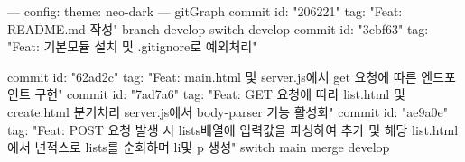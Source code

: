 ---
config:
  theme: neo-dark
---
gitGraph
    commit id: "206221" tag: "Feat: README.md 작성"
    branch develop
    switch develop
    commit id: "3cbf63" tag: "Feat: 기본모듈 설치 및 .gitignore로 예외처리"
    
    commit id: "62ad2c" tag: "Feat: main.html 및 server.js에서 get 요청에 따른 엔드포인트 구현"
    commit id: "7ad7a6" tag: "Feat: GET 요청에 따라 list.html 및 create.html 분기처리 server.js에서 body-parser 기능 활성화"
    commit id: "ae9a0e" tag: "Feat: POST 요청 발생 시 lists배열에 입력값을 파싱하여 추가 및 해당 list.html에서 넌적스로 lists를 순회하며 li및 p 생성"
    switch main
    merge develop